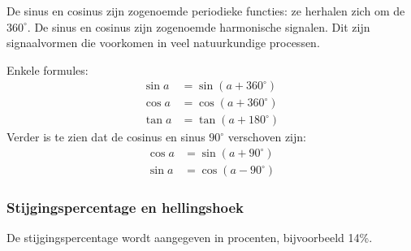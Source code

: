 \documentclass[12pt,fleqn]{article}
\begin{document}
De sinus en cosinus zijn zogenoemde periodieke functies: ze herhalen zich om de $360^\circ$. De sinus en cosinus zijn zogenoemde harmonische signalen. Dit zijn signaalvormen die voorkomen in veel natuurkundige processen.

Enkele formules:
%
\begin{equation}
\begin{split}
\sin a &= \sin(a+360^\circ) \\
\cos a &= \cos(a+360^\circ) \\
\tan a &= \tan(a+180^\circ)
\end{split}\end{equation}
%
Verder is te zien dat de cosinus en sinus $90^\circ$ verschoven zijn:
\begin{equation}\label{key}
\begin{split}
\cos a &= \sin (a+90^\circ) \\
\sin a &= \cos (a-90^\circ)
\end{split}
\end{equation}
%

\subsubsection*{Stijgingspercentage en hellingshoek}
De stijgingspercentage wordt aangegeven in procenten, bijvoorbeeld 14\%.

\begin{figure}[!h]
\centering
{}
\end{figure}
\end{document}
